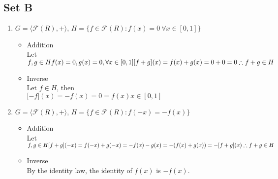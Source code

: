 \documentclass[12pt]{article}
\begin{document}
\subsection*{Set B}
\label{subsec:Set B}

\begin{enumerate}
\item $G = \langle \mathscr{F}(R), + \rangle$, $H = \{f \in \mathscr{F}(R) : f(x) = 0 \ \forall x \in [0,1]\}$
  \begin{itemize}
    \item 
      Addition \\
      Let $f, g \in H \\
      f(x) = 0, g(x) = 0, \forall x \in [0,1] \\
      \lbrack f + g \rbrack (x) = f(x) + g(x) = 0 + 0 = 0 \\
      \therefore f + g \in H$
    \item 
      Inverse \\
      Let $f \in H$, then \\
      $\lbrack -f \rbrack (x) = -f(x) = 0 = f(x) x \in [0,1]$
  \end{itemize}

\item $G = \langle \mathscr{F}(R), + \rangle$, $H = \{f \in \mathscr{F}(R) : f(-x) = -f(x) \}$
\begin{itemize}
  \item Addition \\
      Let $f, g \in H \\
      \lbrack f + g \rbrack (-x) \\
      = f(-x) + g(-x) \\
      = -f(x) - g(x) \\
      = -(f(x) + g(x)) \\
      = -\lbrack f + g \rbrack (x) \\
      \therefore f + g \in H$

    \item Inverse \\
      By the identity law, the identity of $f(x)$ is $-f(x)$.
      
\end{itemize}

\end{enumerate}
\end{document}
